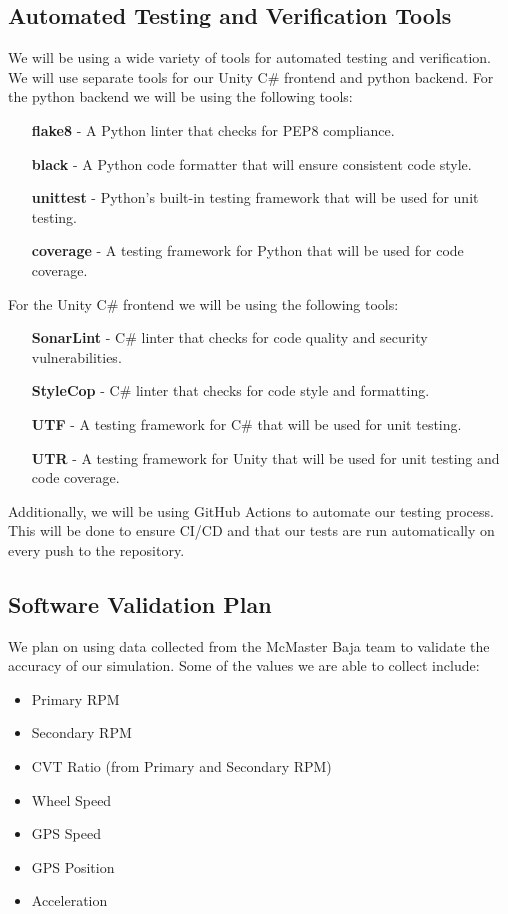 \documentclass[12pt, titlepage]{article}
\begin{document}
\subsection{Automated Testing and Verification Tools}

  \noindent We will be using a wide variety of tools for automated testing and verification.
  We will use separate tools for our Unity C\# frontend and python backend.
  \bigskip
  \newline
  For the python backend we will be using the following tools:
  \begin{itemize}
    \item [\textbf{flake8}] - A Python linter that checks for PEP8 compliance.
    \item [\textbf{black}] - A Python code formatter that will ensure consistent code style.
    \item [\textbf{unittest}] - Python's built-in testing framework that will be used for unit testing.
    \item [\textbf{coverage}] - A testing framework for Python that will be used for code coverage.
  \end{itemize}

  \bigskip
  \noindent For the Unity C\# frontend we will be using the following tools:
  \begin{itemize}
    \item [\textbf{SonarLint}] - C\# linter that checks for code quality and security vulnerabilities.
    \item [\textbf{StyleCop}] - C\# linter that checks for code style and formatting.
    \item [\textbf{UTF}] - A testing framework for C\# that will be used for unit testing.
    \item [\textbf{UTR}] - A testing framework for Unity that will be used for unit testing and code coverage.
  \end{itemize}

  \noindent Additionally, we will be using GitHub Actions to automate our testing process.
  This will be done to ensure CI/CD and that our tests are run automatically on every push to the repository.
\subsection{Software Validation Plan}

\noindent We plan on using data collected from the McMaster Baja team to validate the accuracy of our simulation.
Some of the values we are able to collect include:
\begin{itemize}
  \item Primary RPM
  \item Secondary RPM
  \item CVT Ratio (from Primary and Secondary RPM)
  \item Wheel Speed
  \item GPS Speed
  \item GPS Position
  \item Acceleration
\end{itemize}
\end{document}
